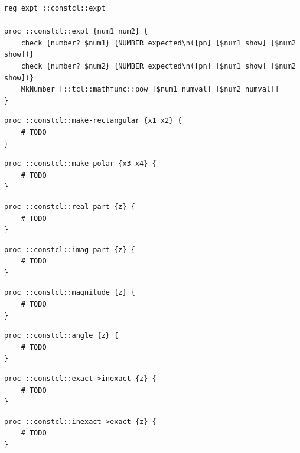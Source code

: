 \documentclass[twoside,9pt]{report}
\begin{document}
\noindent\makebox[\linewidth]{\rule{\linewidth}{0.4pt}}
\begin{lstlisting}
reg expt ::constcl::expt
 
proc ::constcl::expt {num1 num2} {
    check {number? $num1} {NUMBER expected\n([pn] [$num1 show] [$num2 show])}
    check {number? $num2} {NUMBER expected\n([pn] [$num1 show] [$num2 show])}
    MkNumber [::tcl::mathfunc::pow [$num1 numval] [$num2 numval]]
}
\end{lstlisting}
\noindent\makebox[\linewidth]{\rule{\linewidth}{0.4pt}}
\noindent\makebox[\linewidth]{\rule{\linewidth}{0.4pt}}
\begin{lstlisting}
proc ::constcl::make-rectangular {x1 x2} {
    # TODO
}
\end{lstlisting}
\noindent\makebox[\linewidth]{\rule{\linewidth}{0.4pt}}
\noindent\makebox[\linewidth]{\rule{\linewidth}{0.4pt}}
\begin{lstlisting}
proc ::constcl::make-polar {x3 x4} {
    # TODO
}
\end{lstlisting}
\noindent\makebox[\linewidth]{\rule{\linewidth}{0.4pt}}
\noindent\makebox[\linewidth]{\rule{\linewidth}{0.4pt}}
\begin{lstlisting}
proc ::constcl::real-part {z} {
    # TODO
}
\end{lstlisting}
\noindent\makebox[\linewidth]{\rule{\linewidth}{0.4pt}}
\noindent\makebox[\linewidth]{\rule{\linewidth}{0.4pt}}
\begin{lstlisting}
proc ::constcl::imag-part {z} {
    # TODO
}
\end{lstlisting}
\noindent\makebox[\linewidth]{\rule{\linewidth}{0.4pt}}
\noindent\makebox[\linewidth]{\rule{\linewidth}{0.4pt}}
\begin{lstlisting}
proc ::constcl::magnitude {z} {
    # TODO
}
\end{lstlisting}
\noindent\makebox[\linewidth]{\rule{\linewidth}{0.4pt}}
\noindent\makebox[\linewidth]{\rule{\linewidth}{0.4pt}}
\begin{lstlisting}
proc ::constcl::angle {z} {
    # TODO
}
\end{lstlisting}
\noindent\makebox[\linewidth]{\rule{\linewidth}{0.4pt}}
\noindent\makebox[\linewidth]{\rule{\linewidth}{0.4pt}}
\begin{lstlisting}
proc ::constcl::exact->inexact {z} {
    # TODO
}
\end{lstlisting}
\noindent\makebox[\linewidth]{\rule{\linewidth}{0.4pt}}
\noindent\makebox[\linewidth]{\rule{\linewidth}{0.4pt}}
\begin{lstlisting}
proc ::constcl::inexact->exact {z} {
    # TODO
}
\end{lstlisting}
\noindent\makebox[\linewidth]{\rule{\linewidth}{0.4pt}}
\end{document}
